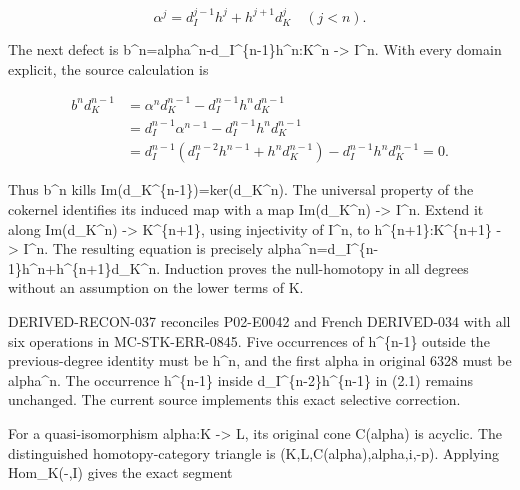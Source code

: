 \[
 \alpha^j=d_I^{j-1}h^j+h^{j+1}d_K^j\quad(j<n).
\]

The next defect is b\textasciicircum{}n\allowbreak{}=alpha\textasciicircum{}n-d\_\allowbreak{}I\textasciicircum{}\{n-1\}h\textasciicircum{}n:\allowbreak{}K\textasciicircum{}n \allowbreak{}-> I\^{}n. With every domain explicit,\allowbreak{} the source calculation is

\[
\begin{aligned}
 b^n d_K^{n-1}
 &=\alpha^n d_K^{n-1}-d_I^{n-1}h^n d_K^{n-1}\\
 &=d_I^{n-1}\alpha^{n-1}-d_I^{n-1}h^n d_K^{n-1}\\
 &=d_I^{n-1}(d_I^{n-2}h^{n-1}+h^n d_K^{n-1})
                      -d_I^{n-1}h^n d_K^{n-1}=0.          
\end{aligned}
\tag{2.1}\]

Thus b\^{}n kills Im(d\_\allowbreak{}K\textasciicircum{}\{n-1\})\allowbreak{}\allowbreak{}=ker(d\_\allowbreak{}K\textasciicircum{}n)\allowbreak{}. The universal property of the cokernel identifies its induced map with a map Im(d\_\allowbreak{}K\textasciicircum{}n)\allowbreak{} \allowbreak{}-> I\^{}n. Extend it along Im(d\_\allowbreak{}K\textasciicircum{}n)\allowbreak{} \allowbreak{}-> K\textasciicircum{}\{n\allowbreak{}+1\},\allowbreak{} using injectivity of I\textasciicircum{}n,\allowbreak{} to h\textasciicircum{}\{n\allowbreak{}+1\}:\allowbreak{}K\textasciicircum{}\{n\allowbreak{}+1\} \allowbreak{}-> I\^{}n. The resulting equation is precisely alpha\textasciicircum{}n\allowbreak{}=d\_\allowbreak{}I\textasciicircum{}\{n-1\}h\textasciicircum{}n\allowbreak{}+h\textasciicircum{}\{n\allowbreak{}+1\}d\_\allowbreak{}K\textasciicircum{}n. Induction proves the null-homotopy in all degrees without an assumption on the lower terms of K.

DERIVED-RECON-037 reconciles P02-E0042 and French DERIVED-034 with all six operations in MC-STK-ERR-0845. Five occurrences of h\^{}\{n-1\} outside the previous-degree identity must be h\textasciicircum{}n,\allowbreak{} and the first alpha in original 6328 must be alpha\^{}n. The occurrence h\^{}\{n-1\} inside d\_\allowbreak{}I\textasciicircum{}\{n-2\}h\textasciicircum{}\{n-1\} in (2.1)\allowbreak{} remains unchanged. The current source implements this exact selective correction.

For a quasi-isomorphism alpha:\allowbreak{}K \allowbreak{}-> L,\allowbreak{} its original cone C(alpha)\allowbreak{} is acyclic. The distinguished homotopy-category triangle is (K,\allowbreak{}L,\allowbreak{}C(alpha)\allowbreak{},\allowbreak{}alpha,\allowbreak{}i,\allowbreak{}-p)\allowbreak{}. Applying Hom\_\allowbreak{}K(-,\allowbreak{}I)\allowbreak{} gives the exact segment

